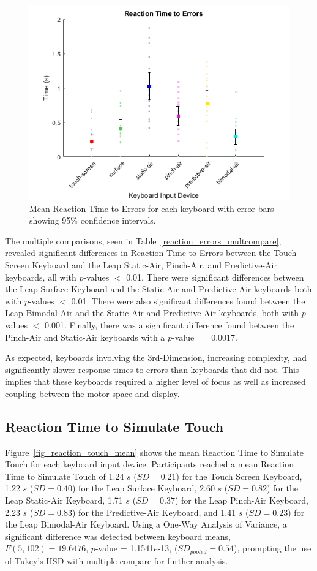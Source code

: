 \begin{figure}[h]
	\centering
	\includegraphics{fig_reaction_errors_mean}
	\caption[Mean Reaction Time to Errors]{Mean Reaction Time to Errors for each keyboard with error bars showing 95\% confidence intervals.}
	\label{fig_reaction_errors_mean}
\end{figure}

The multiple comparisons, seen in Table~\ref{reaction_errors_multcompare}, revealed significant differences in Reaction Time to Errors between the Touch Screen Keyboard and the Leap Static-Air, Pinch-Air, and Predictive-Air keyboards, all with $p$-values $<$ 0.01. There were significant differences between the Leap Surface Keyboard and the Static-Air and Predictive-Air keyboards both with $p$-values $<$ 0.01. There were also significant differences found between the Leap Bimodal-Air and the Static-Air and Predictive-Air keyboards, both with $p$-values $<$ 0.001. Finally, there was a significant difference found between the Pinch-Air and Static-Air keyboards with a $p$-value $=$ 0.0017.

As expected, keyboards involving the 3rd-Dimension, increasing complexity, had significantly slower response times to errors than keyboards that did not. This implies that these keyboards required a higher level of focus as well as increased coupling between the motor space and display.

\subsection{Reaction Time to Simulate Touch}
Figure~\ref{fig_reaction_touch_mean} shows the mean Reaction Time to Simulate Touch for each keyboard input device. Participants reached a mean Reaction Time to Simulate Touch of 1.24 $s$ ($SD = 0.21$) for the Touch Screen Keyboard, 1.22 $s$ ($SD = 0.40$) for the Leap Surface Keyboard, 2.60 $s$ ($SD = 0.82$) for the Leap Static-Air Keyboard, 1.71 $s$ ($SD = 0.37$) for the Leap Pinch-Air Keyboard, 2.23 $s$ ($SD = 0.83$) for the Predictive-Air Keyboard, and 1.41 $s$ ($SD = 0.23$) for the Leap Bimodal-Air Keyboard. Using a One-Way Analysis of Variance, a significant difference was detected between keyboard means, $F(5, 102) = 19.6476$, $p$-value = 1.1541$e$-13, ($SD_{pooled} = 0.54$), prompting the use of Tukey's HSD with multiple-compare for further analysis.

